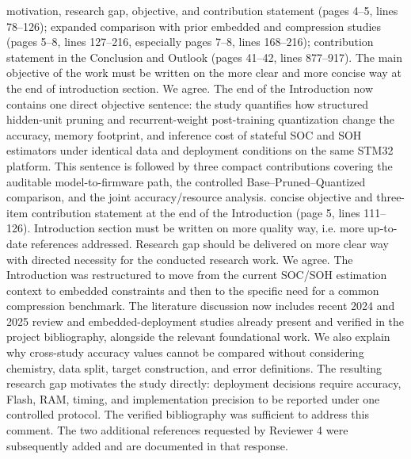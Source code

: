 {} motivation, research gap, objective, and contribution statement (pages 4--5, lines 78--126); expanded comparison with prior embedded and compression studies (pages 5--8, lines 127--216, especially pages 7--8, lines 168--216); contribution statement in the Conclusion and Outlook (pages 41--42, lines 877--917).\markdownRendererInterblockSeparator
{}
\markdownRendererSectionEnd \markdownRendererSectionBegin
{}\markdownRendererInterblockSeparator
{}\markdownRendererBlockQuoteBegin
The main objective of the work must be written on the more clear and more concise way at the end of introduction section.\markdownRendererBlockQuoteEnd \markdownRendererInterblockSeparator
{} We agree. The end of the Introduction now contains one direct objective sentence: the study quantifies how structured hidden-unit pruning and recurrent-weight post-training quantization change the accuracy, memory footprint, and inference cost of stateful SOC and SOH estimators under identical data and deployment conditions on the same STM32 platform. This sentence is followed by three compact contributions covering the auditable model-to-firmware path, the controlled Base--Pruned--Quantized comparison, and the joint accuracy/resource analysis.\markdownRendererParagraphSeparator
{} concise objective and three-item contribution statement at the end of the Introduction (page 5, lines 111--126).\markdownRendererInterblockSeparator
{}
\markdownRendererSectionEnd \markdownRendererSectionBegin
{}\markdownRendererInterblockSeparator
{}\markdownRendererBlockQuoteBegin
Introduction section must be written on more quality way, i.e. more up-to-date references addressed. Research gap should be delivered on more clear way with directed necessity for the conducted research work.\markdownRendererBlockQuoteEnd \markdownRendererInterblockSeparator
{} We agree. The Introduction was restructured to move from the current SOC/SOH estimation context to embedded constraints and then to the specific need for a common compression benchmark. The literature discussion now includes recent 2024 and 2025 review and embedded-deployment studies already present and verified in the project bibliography, alongside the relevant foundational work. We also explain why cross-study accuracy values cannot be compared without considering chemistry, data split, target construction, and error definitions. The resulting research gap motivates the study directly: deployment decisions require accuracy, Flash, RAM, timing, and implementation precision to be reported under one controlled protocol. The verified bibliography was sufficient to address this comment. The two additional references requested by Reviewer 4 were subsequently added and are documented in that response.\markdownRendererParagraphSeparator
